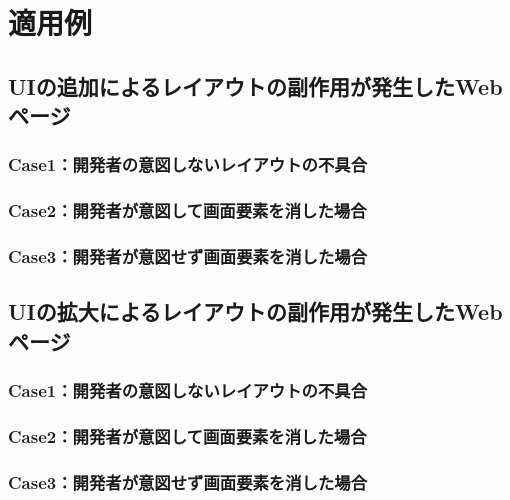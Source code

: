 \chapter{適用例}\label{cha:Indication}



\section{UIの追加によるレイアウトの副作用が発生したWebページ}\label{sec:result_area_detection}

\subsection{Case1：開発者の意図しないレイアウトの不具合}\label{subsec:result_rect_area}

\subsection{Case2：開発者が意図して画面要素を消した場合}\label{subsec:result_underline_area}

\subsection{Case3：開発者が意図せず画面要素を消した場合}\label{subsec:result_underline}


\section{UIの拡大によるレイアウトの副作用が発生したWebページ}\label{sec:result_area_ion}

\subsection{Case1：開発者の意図しないレイアウトの不具合}\label{subsec:result_rect_ara}

\subsection{Case2：開発者が意図して画面要素を消した場合}\label{subsec:result_undere_area}

\subsection{Case3：開発者が意図せず画面要素を消した場合}\label{subsec:result_erline}

